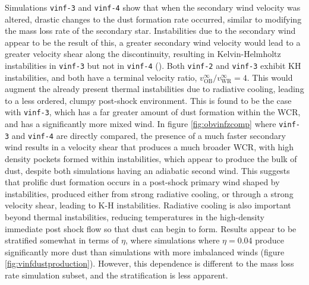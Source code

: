 \documentclass[fleqn,usenatbib]{mnras}
\begin{document}
Simulations \texttt{vinf-3} and \texttt{vinf-4} show that when the secondary wind velocity was altered, drastic changes to the dust formation rate occurred, similar to modifying the mass loss rate of the secondary star.
Instabilities due to the secondary wind appear to be the result of this, a greater secondary wind velocity would lead to a greater velocity shear along the discontinuity, resulting in Kelvin-Helmholtz instabilities in \texttt{vinf-3} but not in \texttt{vinf-4} (\cite{stevens_colliding_1992}).
Both \texttt{vinf-2} and \texttt{vinf-3} exhibit KH instabilities, and both have a terminal velocity ratio, $v_\text{OB}^\infty / v_\text{WR}^\infty = 4$.
This would augment the already present thermal instabilities due to radiative cooling, leading to a less ordered, clumpy post-shock environment.
This is found to be the case with \texttt{vinf-3}, which has a far greater amount of dust formation within the WCR, and has a significantly more mixed wind.
In figure \ref{fig:obvinfzcomp} where \texttt{vinf-3} and \texttt{vinf-4} are directly compared, the presence of a much faster secondary wind results in a velocity shear that produces a much broader WCR, with high density pockets formed within instabilities, which appear to produce the bulk of dust, despite both simulations having an adiabatic second wind. 
This suggests that prolific dust formation occurs in a post-shock primary wind shaped by instabilities, produced either from strong radiative cooling, or through a strong velocity shear, leading to K-H instabilities.
Radiative cooling is also important beyond thermal instabilities, reducing temperatures in the high-density immediate post shock flow so that dust can begin to form.
Results appear to be stratified somewhat in terms of $\eta$, where simulations where $\eta = 0.04$ produce significantly more dust than simulations with more imbalanced winds (figure \ref{fig:vinfdustproduction}).
However, this dependence is different to the mass loss rate simulation subset, and the stratification is less apparent.
\end{document}
